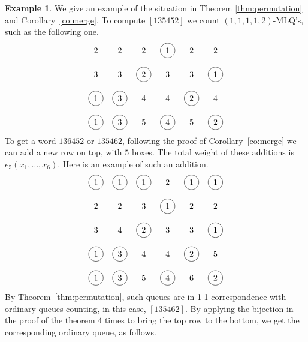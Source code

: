 \documentclass[reqno]{amsart}
\newcommand{\0}{\phantom{c}}
\theoremstyle{plain}
\theoremstyle{definition}
\newtheorem{example}[thm]{Example}
\numberwithin{equation}{section}
\begin{document}
\begin{example}
  We give an example of the situation in Theorem \ref{thm:permutation} and Corollary~\ref{co:merge}. To compute $[135452]$ we count $(1,1,1,1,2)$-MLQ's, such as the following one.
\[
\begin{tikzpicture}\node at (0, 4){2};\node at (1, 4){2};\node at (2, 4){2};\node[circle, draw=black] at (3, 4){1};\node at (4, 4){2};\node at (5, 4){2};\node at (0, 3){3};\node at (1, 3){3};\node[circle, draw=black] at (2, 3){2};\node at (3, 3){3};\node at (4, 3){3};\node[circle, draw=black] at (5, 3){1};\node[circle, draw=black] at (0, 2){1};\node[circle, draw=black] at (1, 2){3};\node at (2, 2){4};\node at (3, 2){4};\node[circle, draw=black] at (4, 2){2};\node at (5, 2){4};\node[circle, draw=black] at (0, 1){1};\node[circle, draw=black] at (1, 1){3};\node at (2, 1){5};\node[circle, draw=black] at (3, 1){4};\node at (4, 1){5};\node[circle, draw=black] at (5, 1){2};\end{tikzpicture}
\]
To get a word $136452$ or $135462$, following the proof of Corollary~\ref{co:merge} we can add a new row on top, with $5$ boxes. The total weight of these additions is $e_5(x_1, \dots, x_6)$. Here is an example of such an addition.
\[
\begin{tikzpicture}\node[circle, draw=black] at (0, 5){1};\node[circle, draw=black] at (1, 5){1};\node[circle, draw=black] at (2, 5){1};\node at (3, 5){2};\node[circle, draw=black] at (4, 5){1};\node[circle, draw=black] at (5, 5){1};\node at (0, 4){2};\node at (1, 4){2};\node at (2, 4){3};\node[circle, draw=black] at (3, 4){1};\node at (4, 4){2};\node at (5, 4){2};\node at (0, 3){3};\node at (1, 3){4};\node[circle, draw=black] at (2, 3){2};\node at (3, 3){3};\node at (4, 3){3};\node[circle, draw=black] at (5, 3){1};\node[circle, draw=black] at (0, 2){1};\node[circle, draw=black] at (1, 2){3};\node at (2, 2){4};\node at (3, 2){4};\node[circle, draw=black] at (4, 2){2};\node at (5, 2){5};\node[circle, draw=black] at (0, 1){1};\node[circle, draw=black] at (1, 1){3};\node at (2, 1){5};\node[circle, draw=black] at (3, 1){4};\node at (4, 1){6};\node[circle, draw=black] at (5, 1){2};\end{tikzpicture}
\]
By Theorem~\ref{thm:permutation}, such queues are in 1-1 correspondence with ordinary queues counting, in this case, $[135462]$. By applying the bijection in the proof of the theorem $4$ times to bring the top row to the bottom, we get the corresponding ordinary queue, as follows.\\


\end{example}
\end{document}
